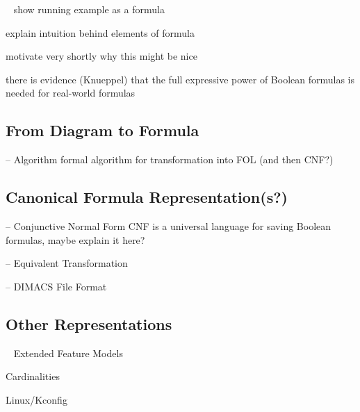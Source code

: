 \begin{frame}{~}
    show running example as a formula
    
    explain intuition behind elements of formula

    motivate very shortly why this might be nice

    there is evidence (Knueppel) that the full expressive power of Boolean formulas is needed for real-world formulas
\end{frame}

\subsection{From Diagram to Formula}

\begin{frame}{-- Algorithm}
    formal algorithm for transformation into FOL (and then CNF?)
\end{frame}

\subsection{Canonical Formula Representation(s?)}

\begin{frame}{-- Conjunctive Normal Form}
    CNF is a universal language for saving Boolean formulas, maybe explain it here?
\end{frame}

\begin{frame}{-- Equivalent Transformation}
    
\end{frame}

\begin{frame}{-- DIMACS File Format}
    
\end{frame}


\subsection{Other Representations} %

\begin{frame}{~}
    Extended Feature Models
    

    Cardinalities

    Linux/Kconfig %
\end{frame}
